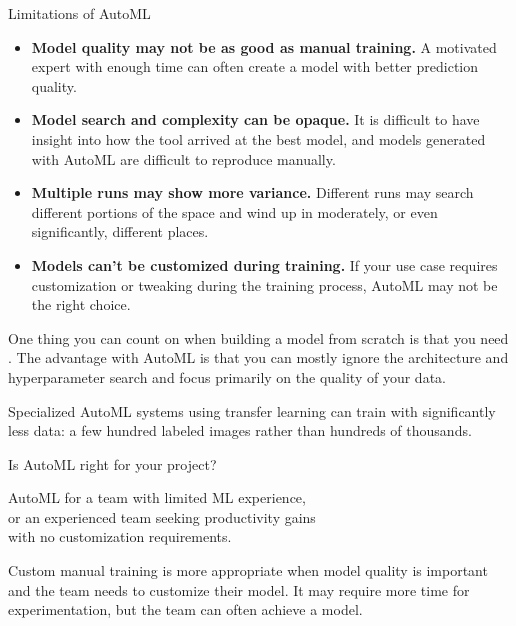 \begin{frame}{Limitations of AutoML}
  \begin{withmargin}
    \begin{tdmain}
      \footnotesize
      \begin{itemize}
        \item \textbf{Model quality may not be as good as manual training.} A
          motivated expert with enough time can often create a model with better
          prediction quality.
        \item \textbf{Model search and complexity can be opaque.} It is
          difficult to have insight into how the tool arrived at the best model,
          and models generated with AutoML are difficult to reproduce manually.
        \item \textbf{Multiple runs may show more variance.} Different runs may
          search different portions of the space and wind up in moderately, or
          even significantly, different places.
        \item \textbf{Models can't be customized during training.} If your use
          case requires customization or tweaking during the training process,
          AutoML may not be the right choice.
      \end{itemize}
    \end{tdmain}
    \begin{tdmargin}
      One thing you can count on when building a model from scratch is that you
      need . The advantage with AutoML is that you
      can mostly ignore the architecture and hyperparameter search and focus
      primarily on the quality of your data.
      \par\medskip
      Specialized AutoML systems using transfer learning can train with
      significantly less data: a few hundred labeled images rather than hundreds
      of thousands.
    \end{tdmargin}
  \end{withmargin}
\end{frame}

\begin{frame}{Is AutoML right for your project?}
  \vfill
  \begin{takeaway}
    AutoML for a team with limited ML experience,\\
    or an experienced team seeking productivity gains\\
    with no customization requirements.
  \end{takeaway}
  \vfill
  {\small Custom manual training is more appropriate when model quality is
  important and the team needs to customize their model. It may require more
  time for experimentation, but the team can often achieve a
   model.}
\end{frame}

